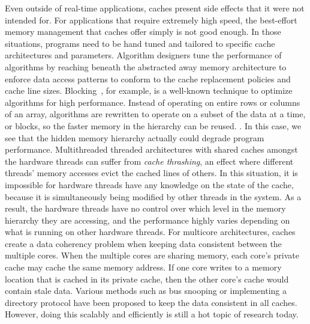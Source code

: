 Even outside of real-time applications, caches present side effects that it were not intended for.  
For applications that require extremely high speed, the best-effort memory management that caches offer simply is not good enough.
In those situations, programs need to be hand tuned and tailored to specific cache architectures and parameters.
Algorithm designers tune the performance of algorithms by reaching beneath the abstracted away memory architecture to enforce data access patterns to conform to the cache replacement policies and cache line sizes. 
Blocking~\cite{Lam91thecache}, for example, is a well-known technique to optimize algorithms for high performance.
Instead of operating on entire rows or columns of an array, algorithms are rewritten to operate on a subset of the data at a time, or blocks, so the faster memory in the hierarchy can be reused.
.
In this case, we see that the hidden memory hierarchy actually could degrade program performance.    
Multithreaded threaded architectures with shared caches amongst the hardware threads can suffer from \emph{cache thrashing}, an effect where different threads' memory accesses evict the cached lines of others.
In this situation, it is impossible for hardware threads have any knowledge on the state of the cache, because it is simultaneously being modified by other threads in the system. 
As a result, the hardware threads have no control over which level in the memory hierarchy they are accessing, and the performance highly varies depending on what is running on other hardware threads. 
For multicore architectures, caches create a data coherency problem when keeping data consistent between the multiple cores.
When the multiple cores are sharing memory, each core's private cache may cache the same memory address. 
If one core writes to a memory location that is cached in its private cache, then the other core's cache would contain stale data. 
Various methods such as bus snooping or implementing a directory protocol have been proposed to keep the data consistent in all caches. 
However, doing this scalably and efficiently is still a hot topic of research today.

